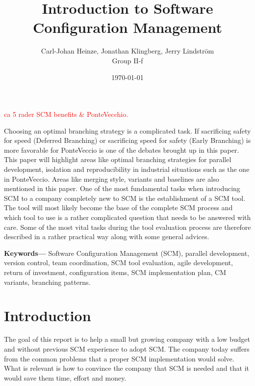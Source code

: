 \documentclass[10pt]{article}
\renewenvironment{abstract}
  {\small\quotation
  {\bfseries\noindent{\large\abstractname}\par\nobreak\smallskip}}
  {\endquotation}
\providecommand{\keywords}[1]{\textbf{{Keywords---}} #1}
\newcommand\remove[1]{\textcolor{red}{#1}}
\begin{document}
\makeatletter
\renewcommand{\@biblabel}[1]{\quad#1.}
\makeatother


\pagestyle{myheadings}


\begin{titlepage}
\title{Introduction to Software Configuration Management}
\author{Carl-Johan Heinze, Jonathan Klingberg, Jerry Lindström \\Group II-f}
\date{\today}
\maketitle
\thispagestyle{empty}
\end{titlepage}

\tableofcontents
\thispagestyle{empty}
\newpage
{}

\begin{abstract}
\remove{ca 5 rader SCM benefits \& PonteVecchio.}

\noindent Choosing an optimal branching strategy is a complicated task. If sacrificing safety for speed (Deferred Branching) or sacrificing speed for safety (Early Branching) is more favorable for PonteVeccio is one of the debates brought up in this paper. This paper will highlight areas like optimal branching strategies for parallel development, isolation and reproducibility in industrial situations such as the one in PonteVeccio. Areas like merging style, variants and baselines are also mentioned in this paper.
\noindent One of the most fundamental tasks when introducing SCM to a company completely new to SCM is the establishment of a SCM tool. The tool will most likely become the base of the complete SCM process and which tool to use is a rather complicated question that needs to be answered with care. Some of the most vital tasks during the tool evaluation process are therefore described in a rather practical way along with some general advices.


\end{abstract}
\keywords{Software Configuration Management (SCM), parallel development, version control, team coordination, SCM tool evaluation, agile development, return of investment, configuration items, SCM implementation plan, CM variants, branching patterns.}

\section{Introduction}
The goal of this report is to help a small but growing company with a low budget and without previous SCM experience to adopt SCM. The company today suffers from the common problems that a proper SCM implementation would solve. What is relevant is how to convince the company that SCM is needed and that it would save them time, effort and money. 
\end{document}
